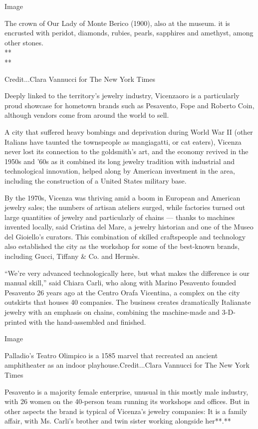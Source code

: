 Image

The crown of Our Lady of Monte Berico (1900), also at the museum. it is
encrusted with peridot, diamonds, rubies, pearls, sapphires and
amethyst, among other stones.\\
**\\
**

Credit...Clara Vannucci for The New York Times

Deeply linked to the territory's jewelry industry, Vicenzaoro is a
particularly proud showcase for hometown brands such as Pesavento, Fope
and Roberto Coin, although vendors come from around the world to sell.

A city that suffered heavy bombings and deprivation during World War II
(other Italians have taunted the townspeople as mangiagatti, or cat
eaters), Vicenza never lost its connection to the goldsmith's art, and
the economy revived in the 1950s and '60s as it combined its long
jewelry tradition with industrial and technological innovation, helped
along by American investment in the area, including the construction of
a United States military base.

By the 1970s, Vicenza was thriving amid a boom in European and American
jewelry sales; the numbers of artisan ateliers surged, while factories
turned out large quantities of jewelry and particularly of chains ---
thanks to machines invented locally, said Cristina del Mare, a jewelry
historian and one of the Museo del Gioiello's curators. This combination
of skilled craftspeople and technology also established the city as the
workshop for some of the best-known brands, including Gucci, Tiffany \&
Co. and Hermès.

``We're very advanced technologically here, but what makes the
difference is our manual skill,'' said Chiara Carli, who along with
Marino Pesavento founded Pesavento 26 years ago at the Centro Orafa
Vicentina, a complex on the city outskirts that houses 40 companies. The
business creates dramatically Italianate jewelry with an emphasis on
chains, combining the machine-made and 3-D-printed with the
hand-assembled and finished.

Image

Palladio's Teatro Olimpico is a 1585 marvel that recreated an ancient
amphitheater as an indoor playhouse.Credit...Clara Vannucci for The New
York Times

Pesavento is a majority female enterprise, unusual in this mostly male
industry, with 26 women on the 40-person team running its workshops and
offices. But in other aspects the brand is typical of Vicenza's jewelry
companies: It is a family affair, with Ms. Carli's brother and twin
sister working alongside her**.**

